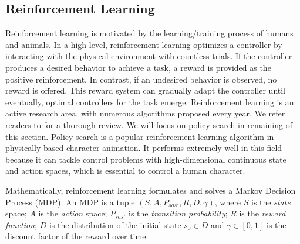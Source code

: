 \subsection{Reinforcement Learning}

Reinforcement learning is motivated by the learning/training process of humans and animals. In a high level, reinforcement learning optimizes a controller by interacting with the physical environment with countless trials. If the controller produces a desired behavior to achieve a task, a reward is provided as the positive reinforcement. In contrast, if an undesired behavior is observed, no reward is offered. This reward system can gradually adapt the controller until eventually, optimal controllers for the task emerge. Reinforcement learning is an active research area, with numerous algorithms proposed every year. We refer readers to \cite{} for a thorough review. We will focus on policy search in remaining of this section. Policy search is a popular reinforcement learning algorithm in physically-based character animation. It performs extremely well in this field because it can tackle control problems with high-dimensional continuous state and action spaces, which is essential to control a human character. 

Mathematically, reinforcement learning formulates and solves a Markov Decision Process (MDP). An MDP is a tuple $(S, A, P_{sas'}, R, D, \gamma)$, where $S$ is the \emph{state} space; $A$ is the \emph{action} space; $P_{sas'}$ is the \emph{transition probability}; $R$ is the \emph{reward function}; $D$ is the distribution of the initial state $s_0 \in D$ and $\gamma \in [0, 1]$ is the discount factor of the reward over time. 

